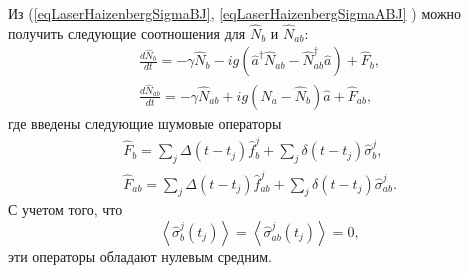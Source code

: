 Из (\ref{eqLaserHaizenbergSigmaBJ},
\ref{eqLaserHaizenbergSigmaABJ} ) можно получить следующие соотношения для
$\hat{N}_b$ и $\hat{N}_{ab}$:
\begin{eqnarray}
\frac{d \hat{N}_b}{d t} = 
- \gamma \hat{N}_{b} -
i g 
 \left(
\hat{a}^{\dag}\hat{N}_{ab} -
\hat{N}_{ab}^{\dag}\hat{a}
\right) + \hat{F}_{b},
\nonumber \\
\frac{d \hat{N}_{ab}}{d t} = 
- \gamma \hat{N}_{ab} 
+ i g 
\left(\hat{N}_{a} -
\hat{N}_{b}\right)\hat{a} 
 + \hat{F}_{ab},
\label{eqLaserHaizenberNB_AB}
\end{eqnarray}
где введены следующие шумовые операторы
\begin{eqnarray}
\hat{F}_{b} = \sum_j\Delta\left(t - t_j\right)\hat{f}^{j}_{b} + \sum_j
\delta\left(t - t_j\right)\hat{\sigma}^{j}_{b}, 
\nonumber \\
\hat{F}_{ab} = \sum_j\Delta\left(t - t_j\right)\hat{f}^{j}_{ab} +
\sum_j \delta\left(t - t_j\right)\hat{\sigma}^{j}_{ab}. 
\label{eqLaserHaizenbergFB_AB}
\end{eqnarray}
С учетом того, что
\[
\left<\hat{\sigma}^{j}_{b}\left(t_j\right)\right> = 
\left<\hat{\sigma}^{j}_{ab}\left(t_j\right)\right> = 0,
\]
эти операторы обладают нулевым средним. 

